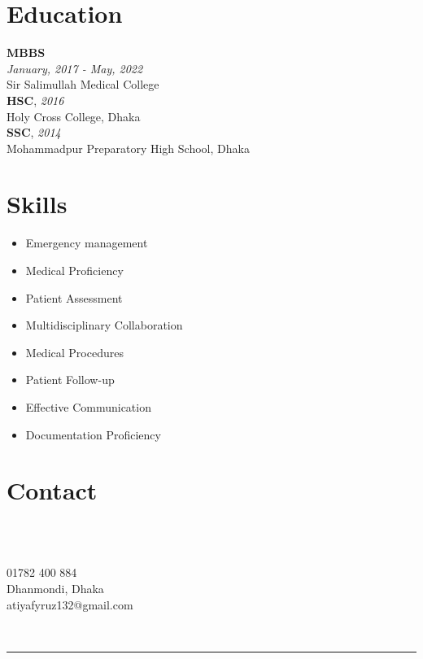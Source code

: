 \documentclass[a4paper,12pt]{article}
\newcommand{\resumeentry}[2]{
    \textbf{#1} \\
    \textit{#2}
}
\begin{document}
\newpage
\begin{minipage}[t][7.4cm]{\textwidth}
\raggedright
\section*{Education}
\resumeentry{MBBS}{January, 2017 - May, 2022}\\ Sir Salimullah Medical College \vspace{0.2cm} \\ 
\textbf{HSC}, \textit{2016}\\ Holy Cross College, Dhaka \vspace{0.2cm} \\
\textbf{SSC}, \textit{2014}\\ Mohammadpur Preparatory High School, Dhaka \\
\end{minipage}
\begin{minipage}[t][8cm]{0.45\textwidth}
\section*{Skills}
\begin{itemize}[left=0em, itemsep=0pt, parsep=0pt]
  \item Emergency management
	\item Medical Proficiency
	\item Patient Assessment
	\item Multidisciplinary Collaboration
	\item Medical Procedures
	\item Patient Follow-up
	\item Effective Communication
	\item Documentation Proficiency
\end{itemize}
\end{minipage}
\hspace{0.5cm}\hspace{0.5cm}
\begin{minipage}[t][8cm]{0.45\textwidth}
\section*{Contact}
    \begin{minipage}[t]{0.1\textwidth}
        \faPhone\\
        \faMapMarker\\
        \faEnvelopeO
    \end{minipage}
    \begin{minipage}[t]{0.7\textwidth}
        01782 400 884\\
        Dhanmondi, Dhaka\\
        atiyafyruz132@gmail.com
    \end{minipage}
\end{minipage}
\\
\begin{minipage}[b][6cm]{0.3\textwidth}
\par\noindent\rule{\textwidth}{0.4pt}
\end{minipage}
\end{document}
